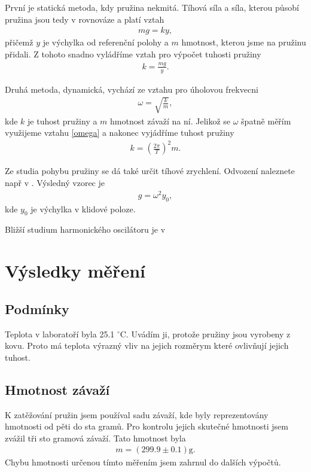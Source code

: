 \documentclass[a4paper,12pt]{article}
\begin{document}
První je statická metoda, kdy pružina nekmitá. Tíhová síla a síla, kterou působí 
pružina jsou tedy v rovnováze a platí vztah
\begin{eqnarray}
	mg=ky,
\end{eqnarray}
přičemž $y$ je výchylka od referenční polohy a $m$ hmotnost, kterou jsme na pružinu přidali.
Z tohoto snadno vyládříme vztah pro výpočet tuhosti pružiny
\begin{eqnarray}
	k=\frac{mg}{y}.
	\label{k_stat}
\end{eqnarray}

Druhá metoda, dynamická, vychází ze vztahu pro úholovou frekvecni
\begin{eqnarray}
	\omega = \sqrt{\frac{k}{m}},
	\label{omega_2}
\end{eqnarray}
kde $k$ je tuhost pružiny a $m$ hmotnost závaží na ní. Jelikož se $\omega$ špatně měřím využijeme 
vztahu \ref{omega} a nakonec vyjádříme tuhost pružiny
\begin{eqnarray}
	k=\left( \frac{2\pi}{T} \right)^2m.
	\label{k_dyn}
\end{eqnarray}

Ze studia pohybu pružiny se dá také určit tíhové zrychlení. Odvození naleznete např v \cite{text}. 
Výsledný vzorec je
\begin{eqnarray}
	g=\omega^2y_0,
	\label{g}
\end{eqnarray}
kde $y_0$ je výchylka v klidové poloze.

Bližší studium harmonického oscilátoru je v \cite{kvasnica}

\section{Výsledky měření}

\subsection{Podmínky}
\noindent
Teplota v laboratoří byla 25.1 $^{\circ}$C. Uvádím ji, protože pružiny jsou vyrobeny z kovu. Proto 
má teplota výrazný vliv na jejich rozměrym které ovlivňují jejich tuhost.

\subsection{Hmotnost závaží}
\noindent
K zatěžování pružin jsem používal sadu závaží, kde byly reprezentovány hmotnosti od pěti do sta gramů.
Pro kontrolu jejich skutečné hmotnosti jsem zvážil tři sto gramová závaží. Tato hmotnost byla
\begin{eqnarray}
	m=(299.9 \pm 0.1) \mbox{g}.
\end{eqnarray}
Chybu hmotnosti určenou tímto měřením jsem zahrnul do dalších výpočtů.
\end{document}
